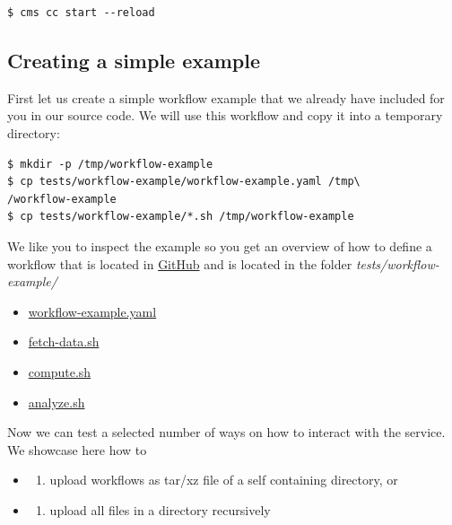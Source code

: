 \smallskip
\begin{verbatim}
$ cms cc start --reload
\end{verbatim}
\smallskip

\subsection{Creating a simple example}\label{creating-a-simple-example}

First let us create a simple workflow example that we already have
included for you in our source code. We will use this workflow and copy
it into a temporary directory:

\smallskip
\begin{verbatim}
$ mkdir -p /tmp/workflow-example
$ cp tests/workflow-example/workflow-example.yaml /tmp\
/workflow-example
$ cp tests/workflow-example/*.sh /tmp/workflow-example
\end{verbatim}
\smallskip


We like you to inspect the example so you get an overview of how to
define a workflow that is located in
\href{https://github.com/cloudmesh/cloudmesh-cc/tree/main/tests/workflow-example}{GitHub} and is located in the folder \emph{tests/workflow-example/}

\begin{itemize}
\item
  \href{https://github.com/cloudmesh/cloudmesh-cc/blob/main/tests/workflow-example/workflow-example.yaml}{workflow-example.yaml}
\item
  \href{https://github.com/cloudmesh/cloudmesh-cc/blob/main/tests/workflow-example/fetch-data.sh}{fetch-data.sh}
\item
  \href{https://github.com/cloudmesh/cloudmesh-cc/blob/main/tests/workflow-example/compute.sh}{compute.sh}
\item
  \href{https://github.com/cloudmesh/cloudmesh-cc/blob/main/tests/workflow-example/analyze.sh}{analyze.sh}
\end{itemize}

Now we can test a selected number of ways on how to interact with the
service. We showcase here how to

\begin{itemize}
\item
  \begin{enumerate}
  \def\labelenumi{\Alph{enumi}.}
  \item
    upload workflows as tar/xz file of a self containing directory, or
  \end{enumerate}
\item
  \begin{enumerate}
  \def\labelenumi{\Alph{enumi}.}
  \setcounter{enumi}{1}
  \item
    upload all files in a directory recursively
  \end{enumerate}
\end{itemize}


